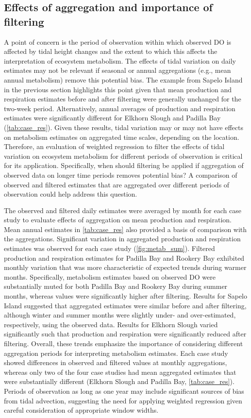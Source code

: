 \documentclass[letterpaper,12pt,oneside]{article}\usepackage[]{graphicx}\usepackage[]{color}
\begin{document}
\subsection{Effects of aggregation and importance of filtering}

A point of concern is the period of observation within which observed \ac{DO} is affected by tidal height changes and the extent to which this affects the interpretation of ecosystem metabolism.  The effects of tidal variation on daily estimates may not be relevant if seasonal or annual aggregations (e.g., mean annual metabolism) remove this potential bias.  The example from Sapelo Island in the previous section highlights this point given that mean production and respiration estimates before and after filtering were generally unchanged for the two-week period. Alternatively, annual averages of production and respiration estimates were significantly different for Elkhorn Slough and Padilla Bay (\cref{tab:case_res}). Given these results, tidal variation may or may not have effects on metabolism estimates on aggregated time scales, depending on the location.  Therefore, an evaluation of weighted regression to filter the effects of tidal variation on ecosystem metabolism for different periods of observation is critical for its application.  Specifically, when should filtering be applied if aggregation of observed data on longer time periods removes potential bias?  A comparison of observed and filtered estimates that are aggregated over different periods of observation could help address this question.

The observed and filtered daily estimates were averaged by month for each case study to evaluate effects of aggregation on mean production and respiration.  Mean annual estimates in \cref{tab:case_res} also provided a basis of comparison with the aggregations. Significant variation in aggregated production and respiration estimates was observed for each case study (\cref{fig:metab_sum}).  Filtered production and respiration estimates for Padilla Bay and Rookery Bay exhibited monthly variation that was more characteristic of expected trends during warmer months.  Specifically, metabolism estimates based on observed \ac{DO} were substantially muted for both Padilla Bay and Rookery Bay during summer months, whereas values were significantly higher after filtering. Results for Sapelo Island suggested that aggregated estimates were similar before and after filtering, although winter and summer months were slightly under- and over-estimated, respectively, using the observed data.  Results for Elkhorn Slough varied significantly such that production and respiration were significantly reduced after filtering.  Overall, these trends emphasize the importance of considering different aggregation periods for interpreting metabolism estimates.  Each case study showed differences in observed and filtered values at monthly aggregations, whereas only two of the four case studies had mean aggregated estimates that were substantially different (Elkhorn Slough and Padilla Bay, \cref{tab:case_res}).  Periods of observation as long as one year may include significant sources of bias from tidal advection, suggesting the need for applying weighted regression given careful consideration of appropriate window widths.       
\end{document}
